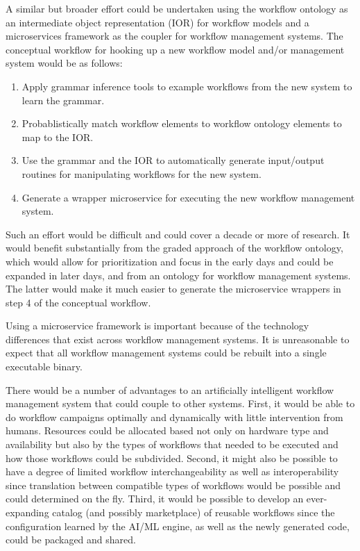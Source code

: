 A similar but broader effort could be undertaken using the workflow ontology as
an intermediate object representation (IOR) for workflow models and a
microservices framework as the coupler for workflow management systems. The
conceptual workflow for hooking up a new workflow model and/or management system
would be as follows:
\begin{enumerate}
  \item Apply grammar inference tools to example workflows from the new system
  to learn the grammar.
  \item Probablistically match workflow elements to workflow ontology elements
  to map to the IOR.
  \item Use the grammar and the IOR to automatically generate input/output
  routines for manipulating workflows for the new system. 
  \item Generate a wrapper microservice for executing the new workflow
  management system.
\end{enumerate}

Such an effort would be difficult and could cover a decade or more of research.
It would benefit substantially from the graded approach of the workflow
ontology, which would allow for prioritization and focus in the early days and
could be expanded in later days, and from an ontology for workflow management
systems. The latter would make it much easier to generate the microservice
wrappers in step 4 of the conceptual workflow.

Using a microservice framework is important because of the technology
differences that exist across workflow management systems. It is unreasonable to
expect that all workflow management systems could be rebuilt into a single
executable binary.

There would be a number of advantages to an artificially intelligent workflow
management system that could couple to other systems. First, it would be able to
do workflow campaigns optimally and dynamically with little intervention from
humans. Resources could be allocated based not only on hardware type and
availability but also by the types of workflows that needed to be executed and
how those workflows could be subdivided. Second, it might also be possible to have
a degree of limited workflow interchangeability as well as interoperability
since translation between compatible types of workflows would be possible and
could determined on the fly. Third, it would be possible to develop an
ever-expanding catalog (and possibly marketplace) of reusable workflows since
the configuration learned by the AI/ML engine, as well as the newly generated
code, could be packaged and shared.

